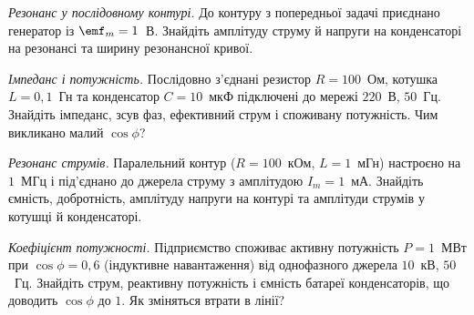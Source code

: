 \begin{problem}\label{prb:ForcedResonanceNumbers}
	\emph{Резонанс у послідовному контурі.} До контуру з попередньої задачі приєднано генератор із $\emf_m=1$~В. Знайдіть амплітуду струму й напруги на конденсаторі на резонансі та ширину резонансної кривої.
\end{problem}

\begin{problem}\label{prb:ImpedanceNumbers}
	\emph{Імпеданс і потужність.} Послідовно з'єднані резистор $R=100$~Ом, котушка $L=0{,}1$~Гн та конденсатор $C=10$~мкФ підключені до мережі $220$~В, $50$~Гц. Знайдіть імпеданс, зсув фаз, ефективний струм і споживану потужність. Чим викликано малий $\cos\phi$?
\end{problem}

\begin{problem}\label{prb:ParallelResonanceNumbers}
	\emph{Резонанс струмів.} Паралельний контур ($R=100$~кОм, $L=1$~мГн) настроєно на $1$~МГц і під'єднано до джерела струму з амплітудою $I_m=1$~мА. Знайдіть ємність, добротність, амплітуду напруги на контурі та амплітуди струмів у котушці й конденсаторі.
\end{problem}

\begin{problem}\label{prb:PowerFactor}
	\emph{Коефіцієнт потужності.} Підприємство споживає активну потужність $P=1$~МВт при $\cos\phi=0{,}6$ (індуктивне навантаження) від однофазного джерела $10$~кВ, $50$~Гц. Знайдіть струм, реактивну потужність і ємність батареї конденсаторів, що доводить $\cos\phi$ до $1$. Як зміняться втрати в лінії?
\end{problem}

